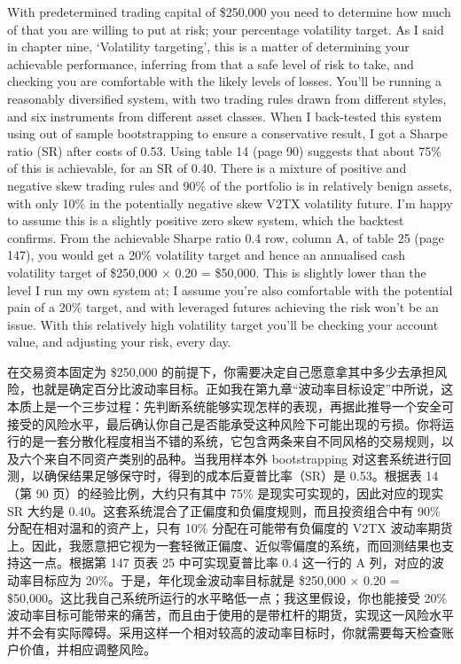 \begin{englishblock} With predetermined trading capital of \$250,000 you need to determine how much of that you are willing to put at risk; your percentage volatility target. As I said in chapter nine, ‘Volatility targeting', this is a matter of determining your achievable performance, inferring from that a safe level of risk to take, and checking you are comfortable with the likely levels of losses. You'll be running a reasonably diversified system, with two trading rules drawn from different styles, and six instruments from different asset classes. When I back-tested this system using out of sample bootstrapping to ensure a conservative result, I got a Sharpe ratio (SR) after costs of 0.53. Using table 14 (page 90) suggests that about 75\% of this is achievable, for an SR of 0.40. There is a mixture of positive and negative skew trading rules and 90\% of the portfolio is in relatively benign assets, with only 10\% in the potentially negative skew V2TX volatility future. I'm happy to assume this is a slightly positive zero skew system, which the backtest confirms. From the achievable Sharpe ratio 0.4 row, column A, of table 25 (page 147), you would get a 20\% volatility target and hence an annualised cash volatility target of \$250,000 × 0.20 = \$50,000. This is slightly lower than the level I run my own system at; I assume you're also comfortable with the potential pain of a 20\% target, and with leveraged futures achieving the risk won't be an issue. With this relatively high volatility target you'll be checking your account value, and adjusting your risk, every day. \end{englishblock}

\begin{chineseblock}在交易资本固定为 \$250,000 的前提下，你需要决定自己愿意拿其中多少去承担风险，也就是确定百分比波动率目标。正如我在第九章“波动率目标设定”中所说，这本质上是一个三步过程：先判断系统能够实现怎样的表现，再据此推导一个安全可接受的风险水平，最后确认你自己是否能承受这种风险下可能出现的亏损。你将运行的是一套分散化程度相当不错的系统，它包含两条来自不同风格的交易规则，以及六个来自不同资产类别的品种。当我用样本外 bootstrapping 对这套系统进行回测，以确保结果足够保守时，得到的成本后夏普比率（SR）是 0.53。根据表 14（第 90 页）的经验比例，大约只有其中 75\% 是现实可实现的，因此对应的现实 SR 大约是 0.40。这套系统混合了正偏度和负偏度规则，而且投资组合中有 90\% 分配在相对温和的资产上，只有 10\% 分配在可能带有负偏度的 V2TX 波动率期货上。因此，我愿意把它视为一套轻微正偏度、近似零偏度的系统，而回测结果也支持这一点。根据第 147 页表 25 中可实现夏普比率 0.4 这一行的 A 列，对应的波动率目标应为 20\%。于是，年化现金波动率目标就是 \$250,000 × 0.20 = \$50,000。这比我自己系统所运行的水平略低一点；我这里假设，你也能接受 20\% 波动率目标可能带来的痛苦，而且由于使用的是带杠杆的期货，实现这一风险水平并不会有实际障碍。采用这样一个相对较高的波动率目标时，你就需要每天检查账户价值，并相应调整风险。\end{chineseblock}

